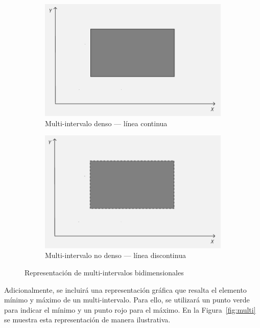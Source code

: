 \begin{figure}[htbp]
  \centering
  \begin{subfigure}[b]{0.48\textwidth}
    \centering
    \includegraphics[width=\linewidth]{figures/Conceptos previos/Multi-intervalos/denso.png}
    \caption{Multi-intervalo denso — línea continua}
  \end{subfigure}
  \hfill
  \begin{subfigure}[b]{0.48\textwidth}
    \centering
    \includegraphics[width=\linewidth]{figures/Conceptos previos/Multi-intervalos/no-denso.png}
    \caption{Multi-intervalo no denso — línea discontinua}
  \end{subfigure}
  \caption{Representación de multi-intervalos bidimensionales}
  \label{fig:multiintervalos}
\end{figure}

Adicionalmente, se incluirá una representación gráfica que resalta el elemento mínimo y máximo de un multi-intervalo. Para ello, se utilizará un punto verde para indicar el mínimo y un punto rojo para el máximo. En la Figura~\ref{fig:multi} se muestra esta representación de manera ilustrativa.

